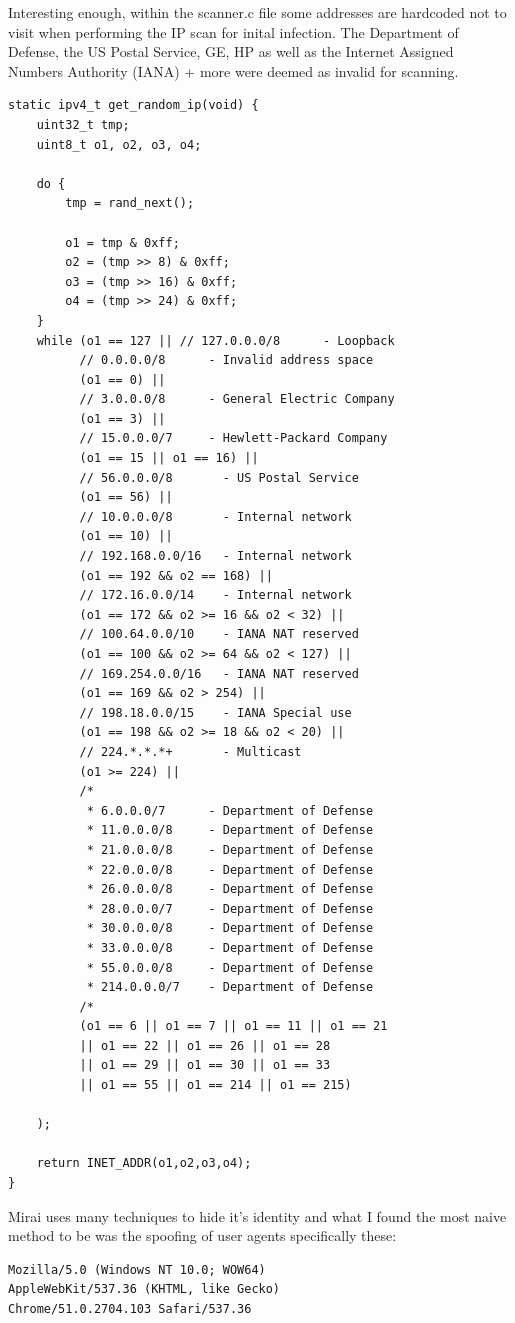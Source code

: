 \documentclass[12pt, letterpaper]{article}
\begin{document}
\begin{sloppypar}
\begin{flushleft}
Interesting enough, within the scanner.c file some addresses are hardcoded not to visit 
when performing the IP scan for inital infection. The Department of Defense, the US Postal
Service, GE, HP as well as the Internet Assigned Numbers Authority (IANA) + more were 
deemed as invalid for scanning.

\begin{lstlisting}
static ipv4_t get_random_ip(void) {
    uint32_t tmp;
    uint8_t o1, o2, o3, o4;

    do {
        tmp = rand_next();

        o1 = tmp & 0xff;
        o2 = (tmp >> 8) & 0xff;
        o3 = (tmp >> 16) & 0xff;
        o4 = (tmp >> 24) & 0xff;
    }
    while (o1 == 127 || // 127.0.0.0/8      - Loopback
          // 0.0.0.0/8		- Invalid address space
          (o1 == 0) || 
          // 3.0.0.0/8		- General Electric Company
          (o1 == 3) || 
          // 15.0.0.0/7		- Hewlett-Packard Company
          (o1 == 15 || o1 == 16) || 
          // 56.0.0.0/8       - US Postal Service
          (o1 == 56) || 
          // 10.0.0.0/8       - Internal network
          (o1 == 10) || 
          // 192.168.0.0/16   - Internal network
          (o1 == 192 && o2 == 168) ||
          // 172.16.0.0/14    - Internal network
          (o1 == 172 && o2 >= 16 && o2 < 32) ||
          // 100.64.0.0/10    - IANA NAT reserved
          (o1 == 100 && o2 >= 64 && o2 < 127) ||
          // 169.254.0.0/16   - IANA NAT reserved
          (o1 == 169 && o2 > 254) ||
          // 198.18.0.0/15    - IANA Special use
          (o1 == 198 && o2 >= 18 && o2 < 20) ||
          // 224.*.*.*+       - Multicast
          (o1 >= 224) ||
		  /*
		   * 6.0.0.0/7		- Department of Defense 
		   * 11.0.0.0/8 	- Department of Defense
		   * 21.0.0.0/8 	- Department of Defense
		   * 22.0.0.0/8 	- Department of Defense
		   * 26.0.0.0/8 	- Department of Defense
		   * 28.0.0.0/7 	- Department of Defense
		   * 30.0.0.0/8 	- Department of Defense
		   * 33.0.0.0/8 	- Department of Defense
		   * 55.0.0.0/8 	- Department of Defense
		   * 214.0.0.0/7	- Department of Defense
		  /*          
          (o1 == 6 || o1 == 7 || o1 == 11 || o1 == 21 
          || o1 == 22 || o1 == 26 || o1 == 28 
          || o1 == 29 || o1 == 30 || o1 == 33 
          || o1 == 55 || o1 == 214 || o1 == 215) 
          
    );

    return INET_ADDR(o1,o2,o3,o4);
}

\end{lstlisting}
Mirai uses many techniques to hide it's identity and what I found the most
naive method to be was the spoofing of user agents specifically these:
\begin{verbatim}
Mozilla/5.0 (Windows NT 10.0; WOW64) 
AppleWebKit/537.36 (KHTML, like Gecko) 
Chrome/51.0.2704.103 Safari/537.36


\end{verbatim}
\end{flushleft}
\end{sloppypar}
\end{document}
